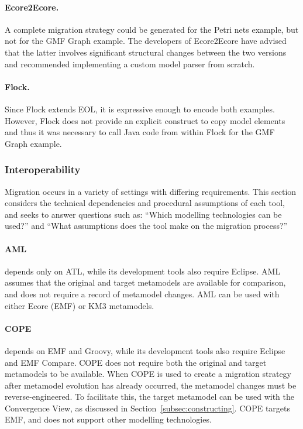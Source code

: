 \paragraph{Ecore2Ecore.} A complete migration strategy could be generated for the Petri nets example, but not for the GMF Graph example. The developers of Ecore2Ecore have advised that the latter involves significant structural changes between the two versions and recommended implementing a custom model parser from scratch.

\paragraph{Flock.} Since Flock extends EOL, it is expressive enough to encode both examples. However, Flock does not provide an explicit construct to copy model elements and thus it was necessary to call Java code from within Flock for the GMF Graph example.



\subsubsection{Interoperability}
Migration occurs in a variety of settings with differing requirements. This section considers the technical dependencies and procedural assumptions of each tool, and seeks to answer questions such as: ``Which modelling technologies can be used?'' and ``What assumptions does the tool make on the migration process?''



\paragraph{AML} depends only on ATL, while its development tools also require Eclipse. AML assumes that the original and target metamodels are available for comparison, and does not require a record of metamodel changes. AML can be used with either Ecore (EMF) or KM3 metamodels.

\paragraph{COPE} depends on EMF and Groovy, while its development tools also require Eclipse and EMF Compare. COPE does not require both the original and target metamodels to be available. When COPE is used to create a migration strategy after metamodel evolution has already occurred, the metamodel changes must be reverse-engineered. To facilitate this, the target metamodel can be used with the Convergence View, as discussed in Section~\ref{subsec:constructing}. COPE targets EMF, and does not support other modelling technologies.

